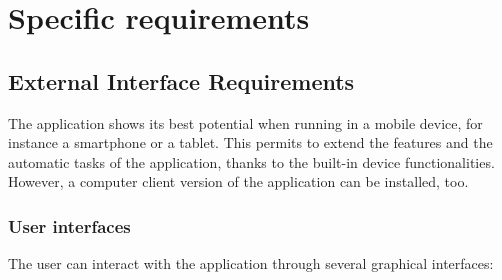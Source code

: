 \chapter{Specific requirements}

\section{External Interface Requirements}
The application shows its best potential when running in a mobile device, for instance a smartphone or a tablet. This permits to extend the features and the automatic tasks of the application, thanks to the built-in device functionalities. However, a computer client version of the application can be installed, too.

\subsection{User interfaces}
The user can interact with the application through several graphical interfaces:
